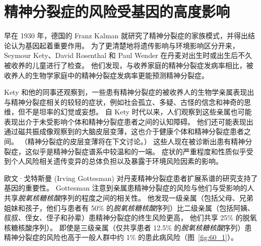 \section{精神分裂症的风险受基因的高度影响}

早在 1930 年，德国的 Franz Kalman 就研究了精神分裂症的家族模式，并得出结论认为基因起着重要作用。
为了更清楚地将遗传影响与环境影响区分开来，Seymour Kety、David Rosenthal 和 Paul Wender 在丹麦对出生时或出生后不久被收养的儿童进行了检查。
他们发现，与收养家庭的精神分裂症发病率相比，被收养人的生物学家庭中的精神分裂症发病率更能预测精神分裂症。


Kety 和他的同事还观察到，一些患有精神分裂症的被收养人的生物学亲属表现出与精神分裂症相关的较轻的症状，例如社会孤立、多疑、古怪的信念和神奇的思维，但不是坦率的幻觉或妄想。
自 Kety 时代以来，人们观察到这些亲属也可能表现出介于未受影响个体和精神分裂症患者之间的认知障碍。
他们还可能表现出通过磁共振成像观察到的大脑皮层变薄，这也介于健康个体和精神分裂症患者之间。 
（精神分裂症的皮层变薄将在下文讨论。）
这些人现在被诊断出患有精神分裂症，这似乎是精神分裂症谱系中较温和的一端。
症状的严重程度和性质似乎受到个人风险相关遗传变异的总体负担以及暴露于环境风险因素的影响。


欧文·戈特斯曼 (Irving Gottesman) 对丹麦精神分裂症患者扩展系谱的研究支持了基因的重要性。
Gottesman 注意到亲属患精神分裂症的风险与他们与受影响的人共享\textit{脱氧核糖核酸}序列的程度之间的相关性。
他发现一级亲属（包括父母、兄弟姐妹和孩子，他们与患者有 50\% 的\textit{脱氧核糖核酸}序列）比二级亲属（包括阿姨、叔叔、侄女、侄子和孙辈）患精神分裂症的终生风险更高， 他们共享 25\% 的脱氧核糖核酸序列）。
即使是三级亲属（仅共享患者 12.5\% 的\textit{脱氧核糖核酸}序列）患精神分裂症的风险也高于一般人群中约 1\% 的患此病风险（图~\ref{fig:60_1}）。


